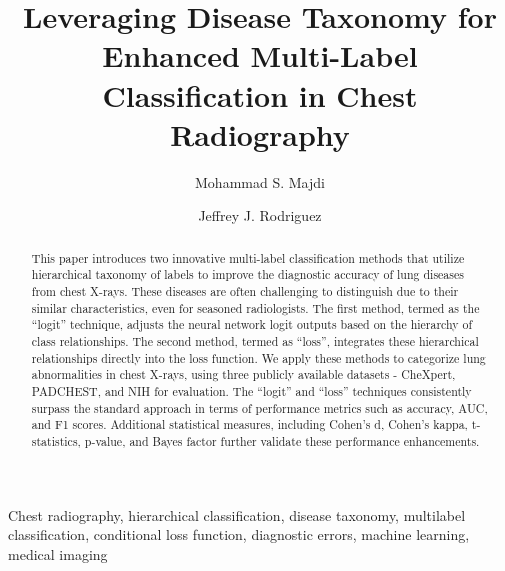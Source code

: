 \documentclass[final,1p,times,authoryear]{elsarticle}
\begin{document}
\begin{frontmatter}

    \title{Leveraging Disease Taxonomy for Enhanced Multi-Label Classification in Chest Radiography}
    \author[]{Mohammad S\@. Majdi}
    \author[]{Jeffrey J\@. Rodriguez}

    \begin{abstract}
        This paper introduces two innovative multi-label classification methods that utilize hierarchical taxonomy of labels to improve the diagnostic accuracy of lung diseases from chest X-rays. These diseases are often challenging to distinguish due to their similar characteristics, even for seasoned radiologists. The first method, termed as the ``logit'' technique, adjusts the neural network logit outputs based on the hierarchy of class relationships. The second method, termed as ``loss'', integrates these hierarchical relationships directly into the loss function. We apply these methods to categorize lung abnormalities in chest X-rays, using three publicly available datasets - CheXpert, PADCHEST, and NIH for evaluation. The ``logit'' and ``loss'' techniques consistently surpass the standard approach in terms of performance metrics such as accuracy, AUC, and F1 scores. Additional statistical measures, including Cohen's d, Cohen's kappa, t-statistics, p-value, and Bayes factor further validate these performance enhancements.
    \end{abstract}
    \begin{keyword}
        Chest radiography, hierarchical classification, disease taxonomy, multilabel classification, conditional loss function, diagnostic errors, machine learning, medical imaging
    \end{keyword}


\end{frontmatter}
\end{document}
